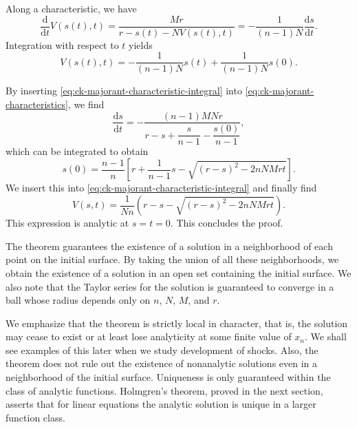 \begin{Proof}
Along a characteristic, we have
\begin{equation}\label{eq:ck-majorant-along-characteristic}
\dfrac{\mathrm{d}}{\mathrm{d}t}V(s(t),t)=\dfrac{Mr}{r-s(t)-NV(s(t),t)}=-\dfrac1{(n-1)N}\dfrac{\mathrm{d}s}{\mathrm{d}t}.
\end{equation}
Integration with respect to $t$ yields
\begin{equation}\label{eq:ck-majorant-characteristic-integral}
V(s(t),t)=-\dfrac1{(n-1)N}s(t)+\dfrac1{(n-1)N}s(0).
\end{equation}


By inserting \eqref{eq:ck-majorant-characteristic-integral} into \eqref{eq:ck-majorant-characteristics}, we find
\begin{equation}\label{eq:ck-reduced-characteristic-equation}
\dfrac{\mathrm{d}s}{\mathrm{d}t}=-\dfrac{(n-1)MNr}{r-s+\dfrac{s}{n-1}-\dfrac{s(0)}{n-1}},
\end{equation}
which can be integrated to obtain
\begin{equation}\label{eq:ck-initial-characteristic-coordinate}
s(0)=\dfrac{n-1}{n}\left[r+\dfrac1{n-1}s-\sqrt{(r-s)^2-2nNMrt}\right].
\end{equation}
We insert this into \eqref{eq:ck-majorant-characteristic-integral} and finally find
\begin{equation}\label{eq:ck-explicit-scalar-majorant}
V(s,t)=\dfrac1{Nn}\left(r-s-\sqrt{(r-s)^2-2nNMrt}\right).
\end{equation}
This expression is analytic at $s=t=0$. This concludes the proof.\end{Proof}

The theorem guarantees the existence of a solution in a neighborhood of each point on the initial surface. By taking the union of all these neighborhoods, we obtain the existence of a solution in an open set containing the initial surface. We also note that the Taylor series for the solution is guaranteed to converge in a ball whose radius depends only on $n$, $N$, $M$, and $r$.

We emphasize that the theorem is strictly local in character, that is, the solution may cease to exist or at least lose analyticity at some finite value of $x_n$. We shall see examples of this later when we study development of shocks. Also, the theorem does not rule out the existence of nonanalytic solutions even in a neighborhood of the initial surface. Uniqueness is only guaranteed within the class of analytic functions. Holmgren's theorem, proved in the next section, asserts that for linear equations the analytic solution is unique in a larger function class.

